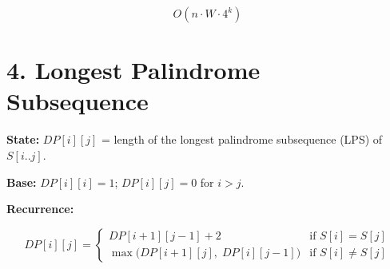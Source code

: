 \documentclass[11pt]{article}
\begin{document}
\[
\boxed{O(n \cdot W \cdot 4^k)}
\]


\section*{4. Longest Palindrome Subsequence}

\textbf{State:}
$DP[i][j]$ = length of the longest palindrome subsequence (LPS) of $S[i..j]$.

\textbf{Base:}
$DP[i][i] = 1$; \quad $DP[i][j] = 0$ for $i > j$.

\vspace{4em}
\textbf{Recurrence:}

\[
DP[i][j] = \begin{cases}
DP[i{+}1][j{-}1] + 2 & \text{if } S[i] = S[j] \\[4pt]
\max\!\big(DP[i{+}1][j],\; DP[i][j{-}1]\big) & \text{if } S[i] \ne S[j]
\end{cases}
\]

\bigskip

\noindent
\begin{minipage}[t]{0.53\textwidth}
\vspace{0pt}
\begin{algorithm}[H]
\DontPrintSemicolon
{}
\end{algorithm}
\end{minipage}%
\begin{minipage}[t]{0.47\textwidth}
\vspace{0pt}
\begin{algorithm}[H]
\DontPrintSemicolon
{}
\end{algorithm}
\end{minipage}
\end{document}
